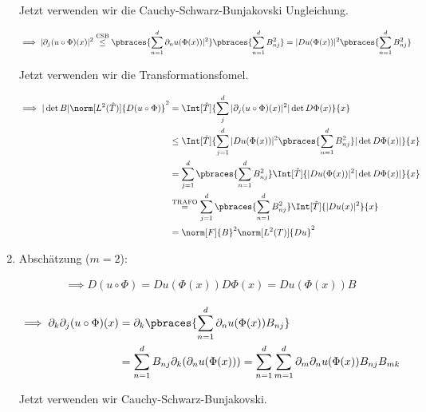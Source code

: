 \begin{solution}
\begin{enumerate}[label = \arabic*.]
  Jetzt verwenden wir die Cauchy-Schwarz-Bunjakovski Ungleichung.

  \begin{align*}
    \implies
    |\partial_j (u \circ \Phi)(x)|^2
    & \stackrel
    {
      \mathrm{CSB}
    }
    {\leq}
    \pbraces
    {
      \sum_{n=1}^d
      \partial_n u(\Phi(x))|^2
    }
    \pbraces
    {
      \sum_{n=1}^d
      B_{nj}^2
    }
    =
    |Du(\Phi(x))|^2
    \pbraces
    {
      \sum_{n=1}^d
      B_{nj}^2
    }
    \end{align*}

  Jetzt verwenden wir die Transformationsfomel.

  \begin{align*}
    \implies
    |\det B| \norm[L^2(\hat T)]{D(u \circ \Phi)}^2
    & =
    \Int[\hat T]
    {
      \sum_j^d
      |\partial_j (u \circ \Phi)(x)|^2
      |\det D \Phi(x)
    }{x} \\
    & \leq
    \Int[\hat T]
    {
      \sum_{j=1}^d
      |Du(\Phi(x))|^2
      \pbraces
      {
        \sum_{n=1}^d
        B_{nj}^2
      }
      |\det D \Phi(x)|
    }{x} \\
    & =
    \sum_{j=1}^d
    \pbraces
    {
      \sum_{n=1}^d
      B_{nj}^2
    }
    \Int[\hat T]
    {
      |Du(\Phi(x))|^2
      |\det D \Phi(x)|
      }{x} \\
    & \stackrel
    {
      \mathrm{TRAFO}
    }{=}
    \sum_{j=1}^d
    \pbraces
    {
      \sum_{n=1}^d
      B_{nj}^2
    }
    \Int[\hat T]
    {
      |Du(x)|^2
    }{x} \\
    & =
    \norm[F]{B}^2 \norm[L^2(T)]{Du}^2
  \end{align*}

  \item Abschätzung ($m = 2$):

  \begin{align*}
    \implies
    D(u \circ \Phi) = Du(\Phi(x))D\Phi(x) = Du(\Phi(x))B
  \end{align*}

  \begin{align*}
    \implies
    \partial_k \partial_j (u \circ \Phi)(x)
    &=
    \partial_k \pbraces
    {
      \sum_{n=1}^d
      \partial_n u(\Phi(x)) B_{nj}
    } \\
    &=
    \sum_{n=1}^d
    B_{nj} \partial_k (\partial_n u(\Phi(x)))
    =
    \sum_{n=1}^d
    \sum_{m=1}^d
    \partial_m \partial_n u(\Phi(x)) B_{nj} B_{mk}
  \end{align*}

  Jetzt verwenden wir Cauchy-Schwarz-Bunjakovski.


\end{enumerate}
\end{solution}
